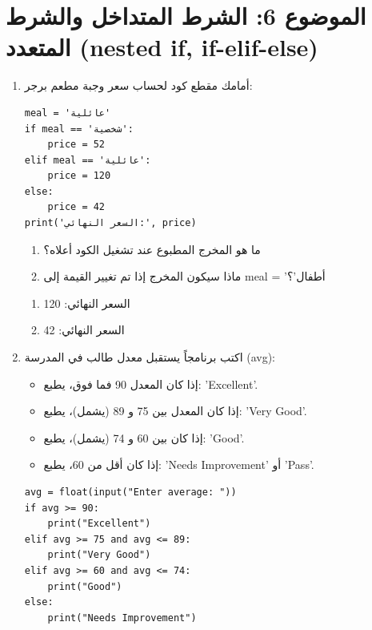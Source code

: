 \documentclass[14pt]{extarticle}
\begin{document}
\section*{الموضوع 6: الشرط المتداخل والشرط المتعدد (\textenglish{nested if, if-elif-else})}
\begin{enumerate}[itemsep=3em]

\item
أمامك مقطع كود لحساب سعر وجبة مطعم برجر:
\begin{boxCode}
\begin{english}
\begin{verbatim}
meal = 'عائلية'
if meal == 'شخصية':
    price = 52
elif meal == 'عائلية':
    price = 120
else:
    price = 42
print('السعر النهائي:', price)
\end{verbatim}
\end{english}
\end{boxCode}
\begin{enumerate}
    \item ما هو المخرج المطبوع عند تشغيل الكود أعلاه؟
    \item ماذا سيكون المخرج إذا تم تغيير القيمة إلى \textenglish{meal = 'أطفال'}؟
\end{enumerate}

\ifwithsols
\begin{boxSolution}
\begin{enumerate}
    \item السعر النهائي: 120
    \item السعر النهائي: 42
\end{enumerate}
\end{boxSolution}
\fi

\item
اكتب برنامجاً يستقبل معدل طالب في المدرسة (\textenglish{avg}):
\begin{itemize}
    \item إذا كان المعدل 90 فما فوق، يطبع: '\textenglish{Excellent}'.
    \item إذا كان المعدل بين 75 و 89 (يشمل)، يطبع: '\textenglish{Very Good}'.
    \item إذا كان بين 60 و 74 (يشمل)، يطبع: '\textenglish{Good}'.
    \item إذا كان أقل من 60، يطبع: '\textenglish{Needs Improvement}' أو '\textenglish{Pass}'.
\end{itemize}

\ifwithsols
\begin{boxSolution}
\begin{english}
\begin{verbatim}
avg = float(input("Enter average: "))
if avg >= 90:
    print("Excellent")
elif avg >= 75 and avg <= 89:
    print("Very Good")
elif avg >= 60 and avg <= 74:
    print("Good")
else:
    print("Needs Improvement")
\end{verbatim}
\end{english}
\end{boxSolution}
\fi

\end{enumerate}
\clearpage
\end{document}

